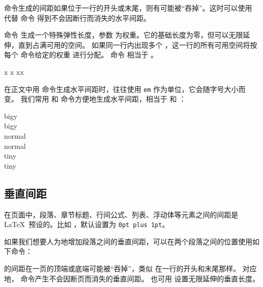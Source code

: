 命令生成的间距如果位于一行的开头或末尾，则有可能被“吞掉”。这时可以使用  代替  命令
得到不会因断行而消失的水平间距。

命令  生成一个特殊弹性长度，参数  为权重。它的基础长度为零，但可以无限延伸，直到占满可用的空间。
如果同一行内出现多个 ，这一行的所有可用空间将按每个  命令给定的权重  进行分配。
命令  相当于 。

\begin{example}
x
x
x\hspace{\fill}x
\end{example}

在正文中用  命令生成水平间距时，往往使用 \texttt{em} 作为单位，它会随字号大小而变。
我们常用  和  命令方便地生成水平间距，相当于 \marg*{1em} 和 \marg*{2em}：

\begin{example}
{\Large big\hspace{1em}y}\\
{\Large big\quad y}\\
nor\hspace{2em}mal\\
nor\qquad mal\\
{\tiny tin\hspace{1em}y}\\
{\tiny tin\quad y}
\end{example}

\subsection{垂直间距}\label{subsec:vspace}

在页面中，段落、章节标题、行间公式、列表、浮动体等元素之间的间距是 \LaTeX\ 预设的。比如  ，默认设置为 \texttt{0pt plus 1pt}。

如果我们想要人为地增加段落之间的垂直间距，可以在两个段落之间的位置使用如下命令：
\begin{command}
\end{command}

 的间距在一页的顶端或底端可能被“吞掉”，类似  在一行的开头和末尾那样。
对应地， 命令产生不会因断页而消失的垂直间距。 也可用  设置无限延伸的垂直长度。

